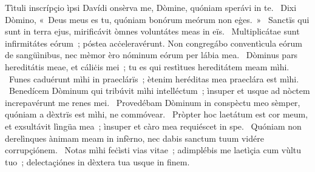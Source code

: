 { Tìtuli inscrípçio ìpsi Davídi}
{%
onsèrva me, Dòmine, quóniam sperávi in te. 
~Dixi Dòmino, «~Deus meus es tu, quóniam bonórum meórum non eġes.~»
~Sanctïs qui sunt in terra ejus, mirificávit òmnes voluntátes meas in eïs. 
~Multiplicátae sunt infirmitátes eórum~; póstea acċeleravérunt. Non congregábo conventìcula eórum de sangüìnibus, nec mèmor èro nóminum eórum per lábia mea. 
~Dòminus pars hereditátis meae, et cáliċis mei~; tu es qui restìtues hereditátem meam mìhi. 
~Funes caduérunt mìhi in praeclárïs~; ètenim heréditas mea praeclára est mìhi. 
~Benedícem Dòminum qui tribúvit mìhi intelléctum~; ìnsuper et usque ad nòctem increpavérunt me renes mei. 
~Provedébam Dòminum in conspèctu meo sèmper, quóniam a dèxtrïs est mìhi, ne commóvear. 
~Pròpter hoc laetátum est cor meum, et exsultávit lìngüa mea~; ìnsuper et càro mea requiéscet in spe. 
~Quóniam non derelìnques ànimam meam in infèrno, nec dabis sanctum tuum vidére corrupçiónem. 
~Notas mìhi feċìsti vias vitae~; adimplébis me laetìçia cum vùltu tuo~; delectaçiónes in dèxtera tua usque in finem. 
}
